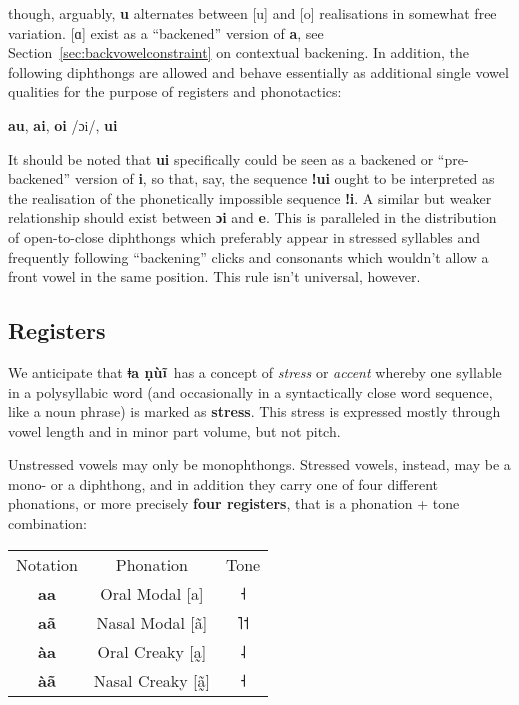 \documentclass[11pt]{book}
\newcommand{\qcn}[1]{\textbf{#1}}
\newcommand{\langname}{\qcn{ǂa ṇùĩ}~}
\begin{document}
though, arguably, \qcn{u} alternates between [u] and [o] realisations in somewhat free variation. [ɑ] exist as a ``backened'' version of \qcn{a}, see Section~\ref{sec:backvowelconstraint} on contextual backening. In addition, the following diphthongs are allowed and behave essentially as additional single vowel qualities for the purpose of registers and phonotactics:

\begin{center}
\qcn{au}, \qcn{ai}, \qcn{oi} /ɔi/, \qcn{ui}
\end{center}

It should be noted that \qcn{ui} specifically could be seen as a backened or ``pre-backened'' version of \qcn{i}, so that, say, the sequence \qcn{ǃui} ought to be interpreted as the realisation of the phonetically impossible sequence \qcn{ǃi}. A similar but weaker relationship should exist between \qcn{ɔi} and \qcn{e}. This is paralleled in the distribution of open-to-close diphthongs which preferably appear in stressed syllables and frequently following ``backening'' clicks and consonants which wouldn't allow a front vowel in the same position. This rule isn't universal, however.

\subsection{Registers}

We anticipate that \langname has a concept of \emph{stress} or \emph{accent} whereby one syllable in a polysyllabic word (and occasionally in a syntactically close word sequence, like a noun phrase) is marked as \textbf{stress}. This stress is expressed mostly through vowel length and in minor part volume, but not pitch.

Unstressed vowels may only be monophthongs. Stressed vowels, instead, may be a mono- or a diphthong, and in addition they carry one of four different phonations, or more precisely \textbf{four registers}, that is a phonation + tone combination:

\begin{center}
\begin{tabular}{c c c}
	Notation & Phonation & Tone\\
	\qcn{aa} & Oral Modal [a] & ˧\\
	\qcn{aã} & Nasal Modal [ã] & ˥˦\\
	\qcn{àa} & Oral Creaky [a̰] & ˨\\
	\qcn{àã} & Nasal Creaky [ã̰]& ˧\\
\end{tabular}
\end{center}
\end{document}
